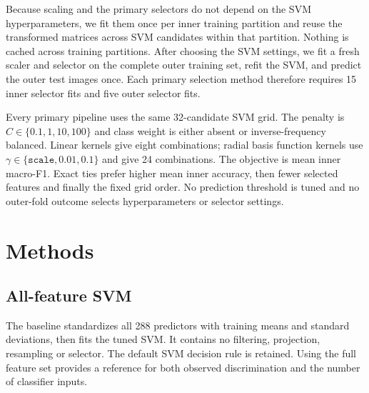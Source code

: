 \documentclass[11pt,a4paper]{article}
\begin{document}
Because scaling and the primary selectors do not depend on the SVM hyperparameters, we fit them once per inner training partition and reuse the transformed matrices across SVM candidates within that partition. Nothing is cached across training partitions. After choosing the SVM settings, we fit a fresh scaler and selector on the complete outer training set, refit the SVM, and predict the outer test images once. Each primary selection method therefore requires 15 inner selector fits and five outer selector fits.

Every primary pipeline uses the same 32-candidate SVM grid. The penalty is $C\in\{0.1,1,10,100\}$ and class weight is either absent or inverse-frequency balanced. Linear kernels give eight combinations; radial basis function kernels use $\gamma\in\{\texttt{scale},0.01,0.1\}$ and give 24 combinations. The objective is mean inner macro-F1. Exact ties prefer higher mean inner accuracy, then fewer selected features and finally the fixed grid order. No prediction threshold is tuned and no outer-fold outcome selects hyperparameters or selector settings.

\section{Methods}
\subsection{All-feature SVM}
The baseline standardizes all 288 predictors with training means and standard deviations, then fits the tuned SVM. It contains no filtering, projection, resampling or selector. The default SVM decision rule is retained. Using the full feature set provides a reference for both observed discrimination and the number of classifier inputs.
\end{document}
